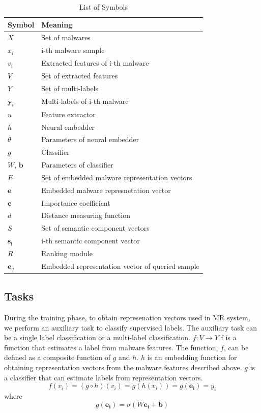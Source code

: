 \begin{table}[!htb] %
\caption{List of Symbols}
\label{tab:notation}
\begin{minipage}{\columnwidth}
\begin{center}
\begin{tabular}{ll}
\toprule
Symbol & Meaning\\
\midrule
  $X$ & Set of malwares \\
  $x_i$ & i-th malware sample \\
  $v_i$ & Extracted features of i-th malware\\
  $V$ & Set of extracted features \\
  $Y$ & Set of multi-labels  \\
  $\mathbf{y}_{i}$ & Multi-labels of i-th malware\\
  $u$ & Feature extractor \\
  $h$ & Neural embedder \\
  $\theta$ & Parameters of neural embedder \\
  $g$ & Classifier \\   
  $W$, $\mathbf{b}$ & Parameters of classifier \\  
  $E$ & Set of embedded malware representation vectors \\
  $\mathbf{e}$ & Embedded malware represnetation vector \\
  $\mathbf{c}$ & Importance coefficient \\
  $d$ & Distance measuring function \\
  $S$ & Set of semantic component vectors \\
  $\mathbf{s_i}$ & i-th semantic component vector \\
  $R$ & Ranking module \\
  $\mathbf{e}_q$ & Embedded representation vector of queried sample \\
  
\bottomrule
\end{tabular}
\end{center}
\bigskip\centering
\end{minipage}
\end{table}


\subsection{Tasks}
During the training phase, to obtain represenation vectors used in MR system, we perform an auxiliary task to classify supervised labels. The auxiliary task can be a single label classification or a multi-label classification. $f: V \rightarrow Y $ f is a function that estimates a label from malware features. The function, $f$, can be defined as a composite function of $g$ and $h$. $h$ is an embedding function for obtaining representation vectors from the malware features described above. $g$ is a classifier that can estimate labels from representation vectors. 
\[
f(v_i) = (g \circ h)(v_i) = g(h(v_i)) = g(\mathbf{e_i}) = y_i 
\]
where
\[
g(\mathbf{e_i}) = \sigma (W\mathbf{e_i} + \mathbf{b}) 
\]

